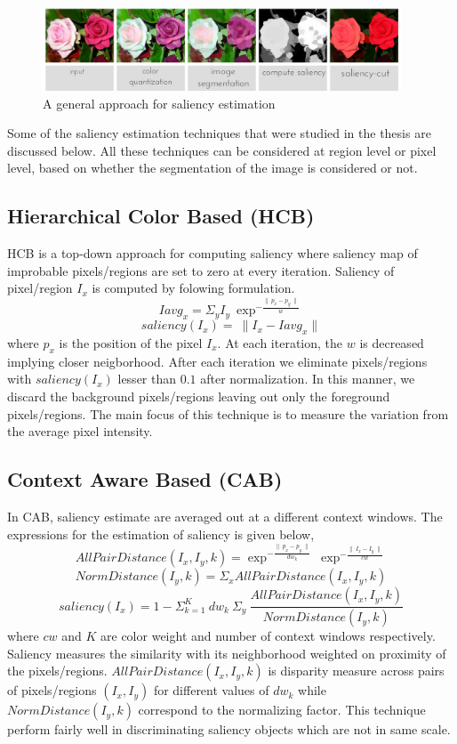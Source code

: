 \begin{figure}[htpb]
   \begin{center}
	    \includegraphics[width=0.95\textwidth]{snaps/sal/saliency.eps}     
     \caption {A general approach for saliency estimation}
   \label{fig:salap}
   \end{center}
 \end{figure}

\par Some of the saliency estimation techniques that were studied in the thesis are discussed below. All these techniques can be considered at region level or pixel level, based on whether the segmentation of the image is considered or not.

\subsection{Hierarchical Color Based (HCB)}
HCB is a top-down approach for computing saliency where saliency map of improbable pixels/regions are set to zero at every iteration. Saliency of pixel/region $I_{x}$ is computed by folowing formulation. 
$$ Iavg_{x} = \Sigma_{y} I_{y}~\exp^{-\frac{\parallel~p_{x} - p_{y}~\parallel}{w}}  $$
$$ saliency(I_{x}) =~\parallel I_{x} - Iavg_{x} \parallel $$
where $p_{x}$ is the position of the pixel $I_{x}$. At each iteration, the $w$ is decreased implying closer neigborhood. After each iteration we eliminate pixels/regions with $ saliency(I_{x})$ lesser than $0.1$ after normalization. In this manner, we  discard the background pixels/regions leaving out only the foreground pixels/regions. The main focus of this technique is to measure the variation from the average pixel intensity.

\subsection{Context Aware Based (CAB)}
In CAB, saliency estimate are averaged out at a different context windows. The expressions for the estimation of saliency is given below,
$$ AllPairDistance(I_{x},I_{y},k) = \exp^{-\frac{\parallel~p_x - p_y~\parallel}{dw_k}}~\exp^{-\frac{\parallel~I_{x} - I_{y}~\parallel}{cw}}$$
$$ NormDistance(I_{y},k) = \Sigma_{x} AllPairDistance(I_{x},I_{y},k)$$
$$ saliency(I_{x}) = 1- \Sigma^{K}_{k=1}~dw_{k}~\Sigma_{y}~\frac{AllPairDistance(I_{x},I_{y},k)}{NormDistance(I_{y},k)}$$
where $cw$ and $K$ are color weight and number of context windows respectively. Saliency measures the similarity with its neighborhood weighted on proximity of the pixels/regions. $AllPairDistance(I_{x},I_{y},k)$ is disparity measure across pairs of pixels/regions $(I_{x},I_{y})$ for different values of $dw_{k}$ while $NormDistance(I_{y},k)$ correspond to the normalizing factor.
This technique perform fairly well in discriminating saliency objects which are not in same scale.

